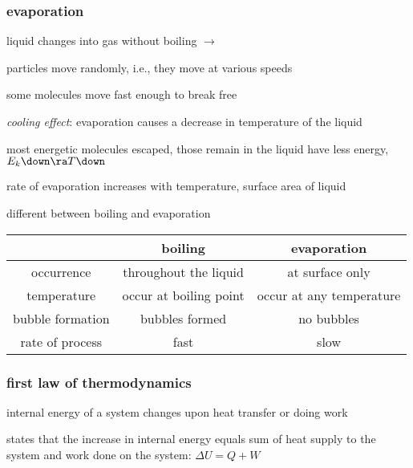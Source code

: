 
\subsubsection*{evaporation}

liquid changes into gas without boiling $\longrightarrow$ 

particles move randomly, i.e., they move at various speeds

some molecules move fast enough to break free

\cmt \emph{cooling effect}: evaporation causes a decrease in temperature of the liquid

most energetic molecules escaped, those remain in the liquid have less energy, $E_k \down \ra T \down$

\cmt rate of evaporation increases with temperature, surface area of liquid

\cmt different between boiling and evaporation

\begin{center}
	\begin{tabular}{|c|c|c|}
		\hline 
		& boiling & evaporation \\ 
		\hline 
		occurrence & throughout the liquid & at surface only \\ 
		\hline 
		temperature & occur at boiling point & occur at any temperature \\ 
		\hline 
		bubble formation & bubbles formed & no bubbles \\ 
		\hline 
		rate of process & fast & slow \\ 
		\hline 
	\end{tabular} 
\end{center}

\subsubsection{first law of thermodynamics}

internal energy of a system changes upon heat transfer or doing work

\begin{ilight}
	 states that the increase in internal energy equals sum of heat supply to the system and work done on the system: $\boxed{\Delta U = Q +  W}$
\end{ilight}

